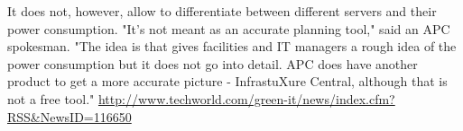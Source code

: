         It does not, however, allow to differentiate between different servers and their power consumption. "It's not meant as an accurate planning tool," said an APC spokesman. "The idea is that gives facilities and IT managers a rough idea of the power consumption but it does not go into detail. APC does have another product to get a more accurate picture - InfrastuXure Central, although that is not a free tool."
        \url{http://www.techworld.com/green-it/news/index.cfm?RSS&NewsID=116650}
        
        
